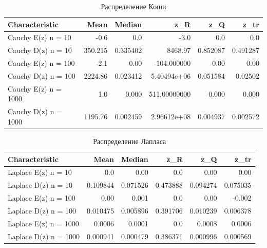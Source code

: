 \documentclass[../body.tex]{subfiles}
\begin{document}
	\begin{table}[H]
	\centering
		\begin{tabular}[t]{lrrrrr}
			\hline
			Characteristic   &        Mean &    Median &            z\_R &       z\_Q &      z\_tr \\
			\hline
			Cauchy E(z) n = 10   &   -0.6 &  0.0 &   -3.0     &  0.0 &  0.0 \\
			Cauchy D(z) n = 10   &  350.215    &  0.335402 & 8468.97        &  0.852087 &  0.491287 \\
			Cauchy E(z) n = 100  &   -2.1  & 0.00 & -104.000000       &  0.00 &  0.00 \\
			Cauchy D(z) n = 100  & 2224.86     &  0.023412 &    5.40494e+06 &  0.051584 &  0.02502  \\
			Cauchy E(z) n = 1000 &    1.0  &  0.000 &  511.00000000       &  0.000  &  0.000 \\
			Cauchy D(z) n = 1000 & 1195.76     &  0.002459 &    2.96612e+08 &  0.004937 &  0.002572 \\
			\hline
		\end{tabular}
	\caption{Распределение Коши}
	\label{tab:couchy}
	\end{table}
	
	\begin{table}[H]
	\centering
		\begin{tabular}[t]{lrrrrr}
			\hline
			Characteristic    &      Mean &    Median &       z\_R &       z\_Q &      z\_tr \\
			\hline
			Laplace E(z) n = 10   &  0.0 &  0.00 &  0.0 &  0.00 &  0.00 \\
			Laplace D(z) n = 10   &  0.109844 &  0.071526 &  0.473888 &  0.094274 &  0.075035 \\
			Laplace E(z) n = 100  &  0.00 &  0.001 &  0.0 &  0.00 & -0.002 \\
			Laplace D(z) n = 100  &  0.010475 &  0.005896 &  0.391706 &  0.010239 &  0.006378 \\
			Laplace E(z) n = 1000 &  0.0006 &  0.0001 &  0.0 &  0.0008 &  0.0006 \\
			Laplace D(z) n = 1000 &  0.000941 &  0.000479 &  0.386371 &  0.000996 &  0.000569 \\
			\hline
		\end{tabular}
		\caption{Распределение Лапласа}
		\label{tab:laplece}
	\end{table}
\end{document}
